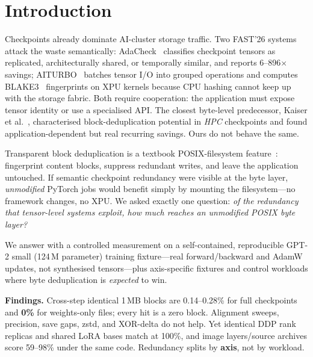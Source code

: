 \documentclass[sigconf,10pt,anonymous,review]{acmart}
\begin{document}
\maketitle

\section{Introduction}
\label{sec:intro}

Checkpoints already dominate AI-cluster storage traffic. Two FAST'26
systems attack
the waste semantically: AdaCheck~\cite{adacheck} classifies checkpoint
tensors as replicated, architecturally shared, or temporally similar,
and reports 6--896$\times$ savings; AITURBO~\cite{aiturbo} batches tensor I/O
into grouped operations and computes BLAKE3~\cite{blake3} fingerprints
on XPU kernels because CPU hashing cannot keep up with the
storage fabric. Both require cooperation: the application
must expose tensor identity or use a specialised API. The closest
byte-level predecessor, Kaiser et al.~\cite{kaiser2016}, characterised
block-deduplication potential in \emph{HPC} checkpoints and found
application-dependent but real recurring savings. Ours
do not behave the same.

Transparent block deduplication is a textbook
POSIX-filesystem feature~\cite{idedup,venti}: fingerprint content blocks,
suppress redundant writes, and leave the application untouched. If
semantic checkpoint redundancy were visible at the byte layer,
\emph{unmodified} PyTorch jobs would benefit simply by mounting the
filesystem---no framework changes, no XPU. We asked exactly one question:
\emph{of the redundancy that tensor-level systems exploit, how much
reaches an unmodified POSIX byte layer?}

We answer with a controlled measurement on a self-contained, reproducible
GPT-2 small (124\,M parameter) training fixture---real forward/backward
and AdamW updates, not synthesised tensors---plus axis-specific fixtures
and control workloads where byte deduplication is \emph{expected} to win.

\smallskip
\noindent\textbf{Findings.}
Cross-step identical 1\,MB blocks are 0.14--0.28\% for full checkpoints
and \textbf{0\%} for weights-only files; every hit is a zero block.
Alignment sweeps, precision, save gaps, zstd, and XOR-delta do not help.
Yet identical DDP rank replicas and
shared LoRA bases match at 100\%, and image layers/source archives score
59--98\% under the same code. Redundancy splits by \textbf{axis}, not by
workload.
\end{document}
